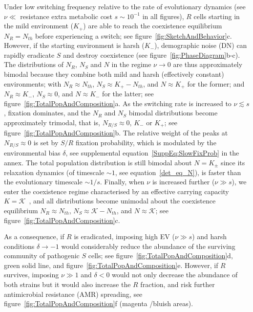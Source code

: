\documentclass{article}
\begin{document}
Under low switching frequency relative to the rate of evolutionary dynamics (see \(\nu\ll\) resistance extra metabolic cost \(s\sim10^{-1}\) in all figures), $R$ cells starting in the mild environment (\(K_{+}\)) are able to reach the coexistence equilibrium \(N_R=N_{th}\) before experiencing a switch; see figure~\ref{fig:SketchAndBehavior}c. However, if the starting environment is harsh (\(K_{-}\)), demographic noise (DN) can rapidly eradicate $S$ and destroy coexistence (see figure~\ref{fig:PhaseDiagram}b-c). The distributions of \(N_R\), \(N_S\) and \(N\) in the regime \(\nu\rightarrow0\) are thus approximately bimodal because they combine both mild and harsh (effectively constant) environments; with \(N_{R}\approx N_{th}\), \(N_{S}\approx K_{+}-N_{th}\), and \(N\approx K_{+}\) for the former; and \(N_{R}\approx K_{-}\), \(N_{S}\approx 0\), and \(N\approx K_{-}\) for the latter; see figure~\ref{fig:TotalPopAndComposition}a. As the switching rate is increased to \(\nu\lesssim s\), fixation dominates, and the \(N_R\) and \(N_S\) bimodal distributions become approximately trimodal, that is, \(N_{R/S}\approx 0\), \(K_{-}\) or \(K_{+}\); see figure~\ref{fig:TotalPopAndComposition}b. The relative weight of the peaks at \(N_{R/S}\approx 0\) is set by \(S/R\) fixation probability, which is modulated by the environmental bias \(\delta\), see supplemental equation~\eqref{SuppEq:SlowFixProb} in the annex. The total population distribution is still bimodal about \(N=K_{\pm}\) since its relaxation dynamics (of timescale \(\sim 1\), see equation~\eqref{det_eq_N}), is faster than the evolutionary timescale $\sim 1/s$. Finally, when \(\nu\) is increased further (\(\nu\gg s\)), we enter the coexistence regime characterised by an effective carrying capacity \(K=\mathcal{K}\)~\cite{wienand2017evolution,wienand2018eco,west2020,taitelbaum2020population,Shibasaki2021,taitelbaum2023evolutionary}, and all distributions become unimodal about the coexistence equilibrium \(N_{R}\approx N_{th}\), \(N_{S}\approx \mathcal{K}-N_{th}\), and \(N\approx \mathcal{K}\); see figure~\ref{fig:TotalPopAndComposition}c.

As a consequence, if $R$ is eradicated, imposing high EV ($\nu\gg s$) and harsh conditions $\delta \to -1$ would considerably reduce the abundance of the surviving community of pathogenic $S$ cells; see figure~\ref{fig:TotalPopAndComposition}d, green solid line, and figure~\ref{fig:TotalPopAndComposition}e. However, if $R$ survives, imposing $\nu\gg 1$ and $\delta<0$ would not only decrease the abundance of both strains but it would also increase the $R$ fraction, and risk further antimicrobial resistance (AMR) spreading, see figure~\ref{fig:TotalPopAndComposition}f (magenta /bluish areas).
\end{document}

